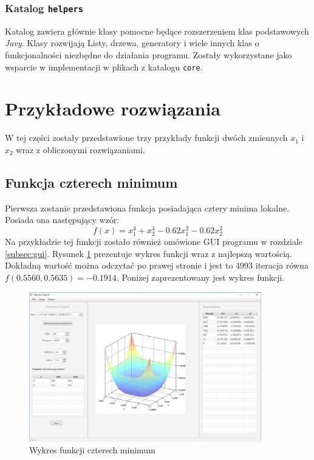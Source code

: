 \documentclass[10pt, a4paper]{article}
\begin{document}
\subsubsection{Katalog {\tt helpers}}
\label{subsubsec:helpers}
Katalog zawiera głównie klasy pomocne będące rozszerzeniem klas podstawowych {\em Javy}. Klasy rozwijają Listy, drzewa, generatory i wiele innych klas o funkcjonalności niezbędne do działania programu. Zostały wykorzystane jako wsparcie w implementacji w plikach z katalogu {\tt core}.

\section{Przykładowe rozwiązania}
\label{sec:przyklady}
W tej części zostały przedstawione trzy przykłady funkcji dwóch zmiennych {\em $x_{1}$} i {\em $x_{2}$} wraz z obliczonymi rozwiązaniami. 

\subsection{Funkcja czterech minimum}
\label{subsec:fcn4min}
Pierwsza zostanie przedstawiona funkcja posiadająca cztery minima lokalne. Posiada ona następujący wzór: $$f(x) = x_{1}^{4}+x_{2}^{4}-0.62x_{1}^{2}-0.62x_{2}^{2} $$ Na przykładzie tej funkcji zostało również omówione GUI programu w rozdziale \ref{subsec:gui}. Rysunek \ref{fig:4} prezentuje wykres funkcji wraz z najlepszą wartością. Dokładną wartość można odczytać po prawej stronie i jest to 4993 iteracja równa $f(0.5560,0.5635) = -0.1914$. Poniżej zaprezentowany jest wykres funkcji. 
\begin{figure}[htbp]
	\centering
		\includegraphics[width=0.90\textwidth]{images/3.PNG}
		\caption{Wykres funkcji czterech minimum}
		\label{fig:4}
\end{figure}
\end{document}
